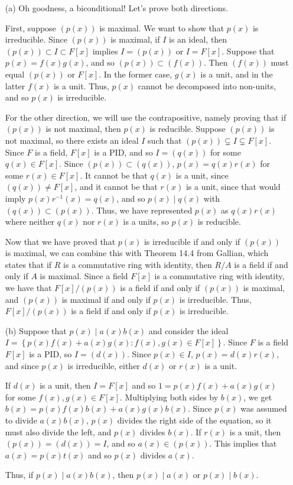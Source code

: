 \documentclass{hmwk}
\begin{document}
\begin{solution}
\begin{itemize}
    \item[(a)] Oh goodness, a biconditional! Let's prove both directions. 

    First, suppose $(p(x))$ is maximal. We want to show that $p(x)$ is irreducible. Since $(p(x))$ is maximal, if $I$ is an ideal, then $(p(x)) \subset I \subset F[x]$ implies $I = (p(x))$ or $I = F[x]$. Suppose that $p(x) = f(x)g(x)$, and so $(p(x)) \subset (f(x))$. Then $(f(x))$ must equal $(p(x))$ or $F[x]$. In the former case, $g(x)$ is a unit, and in the latter $f(x)$ is a unit. Thus, $p(x)$ cannot be decomposed into non-units, and so $p(x)$ is irreducible.

    For the other direction, we will use the contrapositive, namely proving that if $(p(x))$ is not maximal, then $p(x)$ is reducible. Suppose $(p(x))$ is not maximal, so there exists an ideal $I$ such that $(p(x)) \subsetneq I \subsetneq F[x]$. Since $F$ is a field, $F[x]$ is a PID, and so $I = (q(x))$ for some $q(x) \in F[x]$. Since $(p(x)) \subset (q(x))$, $p(x) = q(x)r(x)$ for some $r(x) \in F[x]$. It cannot be that $q(x)$ is a unit, since $(q(x)) \neq F[x]$, and it cannot be that $r(x)$ is a unit, since that would imply $p(x)r^{-1}(x) = q(x)$, and so $p(x) \mid q(x)$ with $(q(x)) \subset (p(x))$. Thus, we have represented $p(x)$ as $q(x)r(x)$ where neither $q(x)$ nor $r(x)$ is a units, so $p(x)$ is reducible. 

    Now that we have proved that $p(x)$ is irreducible if and only if $(p(x))$ is maximal, we can combine this with Theorem 14.4 from Gallian, which states that if $R$ is a commutative ring with identity, then $R/A$ is a field if and only if $A$ is maximal. Since a field $F[x]$ is a commutative ring with identity, we have that $F[x]/(p(x))$ is a field if and only if $(p(x))$ is maximal, and $(p(x))$ is maximal if and only if $p(x)$ is irreducible. Thus, $F[x]/(p(x))$ is a field if and only if $p(x)$ is irreducible. 
    
    \item[(b)] Suppose that $p(x) \mid a(x)b(x)$ and consider the ideal $I = \left\{p(x)f(x) + a(x)g(x) : f(x), g(x) \in F[x]\right\}$. Since $F$ is a field $F[x]$ is a PID, so $I = (d(x))$. Since $p(x) \in I$, $p(x) = d(x)r(x)$, and since $p(x)$ is irreducible, either $d(x)$ or $r(x)$ is a unit.
    
    If $d(x)$ is a unit, then $I = F[x]$ and so $1 = p(x)f(x) + a(x)g(x)$ for some $f(x), g(x) \in F[x]$. Multiplying both sides by $b(x)$, we get $b(x) = p(x)f(x)b(x) + a(x)g(x)b(x)$. Since $p(x)$ was assumed to divide $a(x)b(x)$, $p(x)$ divides the right side of the equation, so it must also divide the left, and $p(x)$ divides $b(x)$. If $r(x)$ is a unit, then $(p(x)) = (d(x)) = I$, and so $a(x) \in (p(x))$. This implies that $a(x) = p(x)t(x)$ and so $p(x)$ divides $a(x)$. 
    
    Thus, if $p(x) \mid a(x)b(x)$, then $p(x) \mid a(x)$ or $p(x) \mid b(x)$. 
\end{itemize}
\end{solution}
\end{document}
